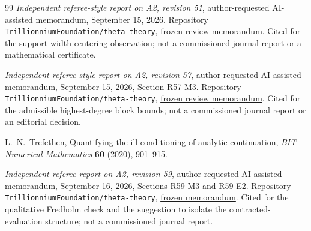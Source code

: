 \begin{thebibliography}{99}
\emph{Independent referee-style report on A2, revision 51},
author-requested AI-assisted memorandum, September 15, 2026.
Repository \texttt{TrillionniumFoundation/theta-theory},
\href{https://github.com/TrillionniumFoundation/theta-theory/blob/d0fd9a9b0d5cdd8004f42a7f109e39de50adda75/reviews/a2-v51-independent-harsh-top4-2026-09-15/REFEREE_REPORT.md}{frozen review memorandum}.
Cited for the support-width centering observation; not a commissioned
journal report or a mathematical certificate.


\emph{Independent referee-style report on A2, revision 57},
author-requested AI-assisted memorandum, September 15, 2026,
Section R57-M3. Repository
\texttt{Trillionnium\allowbreak Foundation/\allowbreak theta-theory},
\href{https://github.com/TrillionniumFoundation/theta-theory/commit/e14138660e716daf60471f3b98e8f1d30cb61a34}{frozen review memorandum}.
Cited for the admissible highest-degree block bounds; not a commissioned
journal report or an editorial decision.

L.~N.~Trefethen, Quantifying the ill-conditioning of analytic continuation,
\emph{BIT Numerical Mathematics} \textbf{60} (2020), 901--915.


\emph{Independent referee report on A2, revision 59},
author-requested AI-assisted memorandum, September 16, 2026,
Sections R59-M3 and R59-E2. Repository
\texttt{Trillionnium\allowbreak Foundation/\allowbreak theta-theory},
\href{https://github.com/TrillionniumFoundation/theta-theory/blob/f480cf1d099128c0c84df1ed149cff9b75e6ba2d/reviews/a2-v59-independent-harsh-top4-2026-09-16/REFEREE_REPORT.md}{frozen memorandum}.
Cited for the qualitative Fredholm check and the suggestion to isolate
the contracted-evaluation structure; not a commissioned journal report.

\end{thebibliography}
